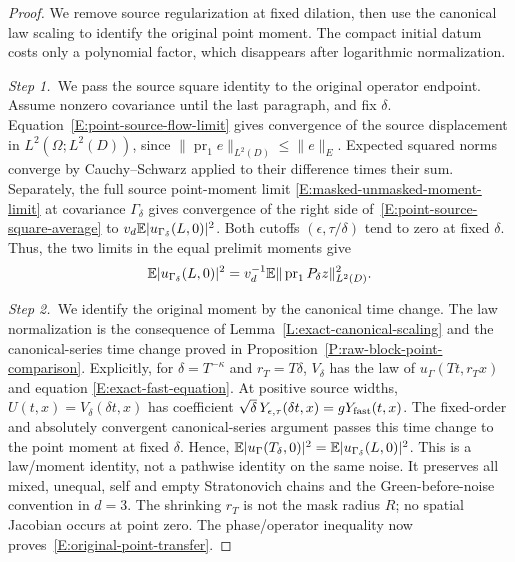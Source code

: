 \begin{proof}
  We remove source regularization at fixed dilation, then use the canonical
  law scaling to identify the original point moment. The compact initial datum
  costs only a polynomial factor, which disappears after logarithmic
  normalization.


  \medskip
  \noindent\textit{Step 1.~}We pass the source square identity to the original
  operator endpoint.
  Assume nonzero covariance until the last paragraph, and fix $\delta$.
  Equation~\eqref{E:point-source-flow-limit} gives convergence of the source
  displacement in $L^2(\Omega;L^2(D))$, since $\|\operatorname{pr}_1e\|_{L^2(D)}
  \le \|e\|_E$. Expected squared norms converge by Cauchy--Schwarz applied to
  their difference times their sum. Separately, the full source point-moment
  limit \eqref{E:masked-unmasked-moment-limit} at covariance $\Gamma_\delta$
  gives convergence of the right side of~\eqref{E:point-source-square-average}
  to $v_d\mathbb{E}|u_{\Gamma_\delta}(L,0)|^2$. Both cutoffs $(\epsilon,\tau/\delta)$
  tend to zero at fixed $\delta$. Thus, the two limits in the equal prelimit
  moments give
  \[
    \mathbb{E}|u_{\Gamma_\delta}(L,0)|^2
    =v_d^{-1}\mathbb{E}\|\operatorname{pr}_1P_\delta z\|_{L^2(D)}^2 .
  \]


  \medskip
  \noindent\textit{Step 2.~}We identify the original moment by the canonical
  time change.
  The law normalization is the consequence of
  Lemma~\ref{L:exact-canonical-scaling} and the canonical-series time change
  proved in Proposition~\ref{P:raw-block-point-comparison}. Explicitly, for
  $\delta = T^{-\kappa}$ and $r_T = T\delta$, $V_\delta$ has the law of
  $u_\Gamma(Tt,r_Tx)$ and equation \eqref{E:exact-fast-equation}. At positive
  source widths, $U(t,x) = V_\delta(\delta t,x)$ has coefficient
  $\sqrt\delta\,Y_{\epsilon,\tau}(\delta t,x) = gY_{\rm fast}(t,x)$. The
  fixed-order and absolutely convergent canonical-series argument passes this
  time change to the point moment at fixed $\delta$. Hence,
  $\mathbb{E}|u_\Gamma(T_\delta,0)|^2 = \mathbb{E}|u_{\Gamma_\delta}(L,0)|^2$. This is a
  law/moment identity, not a pathwise identity on the same noise. It preserves
  all mixed, unequal, self and empty Stratonovich chains and the
  Green-before-noise convention in $d = 3$. The shrinking $r_T$ is not the mask
  radius $R$; no spatial Jacobian occurs at point zero. The phase/operator
  inequality now proves~\eqref{E:original-point-transfer}.



\end{proof}
